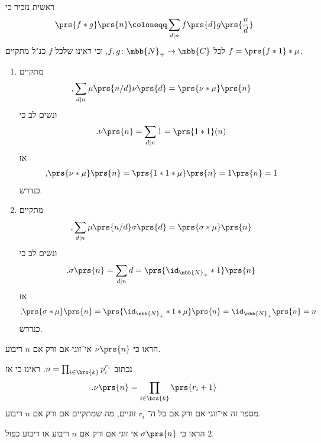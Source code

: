 \documentclass[a4paper,10pt,twoside,openany]{book}
\begin{document}
\begin{solution}
ראשית נזכיר כי
\begin{align*}
\prs{f * g}\prs{n} \coloneqq \sum_{d \mid n} f\prs{d} g\prs{\frac{n}{d}}
\end{align*}
לכל
$f,g \colon \mbb{N}_+ \to \mbb{C}$,
וכי ראינו שלכל
$f$
כנ"ל מתקיים
$f = \prs{f * 1} * \mu$.

\begin{enumerate}[label = (\alph*)]
\item
מתקיים
\[\text{,} \sum_{d \mid n} \mu\prs{n/d} \nu\prs{d} = \prs{\nu * \mu}\prs{n}\]
ונשים לב כי
\[\text{.} \nu\prs{n} = \sum_{d \mid n} 1 = \prs{1 * 1}(n)\]
אז
\begin{align*}
\text{,} \prs{\nu * \mu}\prs{n} = \prs{1 * 1 * \mu}\prs{n} = 1\prs{n} = 1
\end{align*}
כנדרש.

\item
מתקיים
\begin{align*}
\text{,} \sum_{d \mid n} \mu\prs{n/d} \sigma\prs{d} = \prs{\sigma * \mu}\prs{n}
\end{align*}
ונשים לב כי
\[\text{.} \sigma\prs{n} = \sum_{d \mid n} d = \prs{\id_{\mbb{N}_+} * 1}\prs{n}\]
אז
\begin{align*}
\text{,} \prs{\sigma * \mu}\prs{n} = \prs{\id_{\mbb{N}_+} * 1 * \mu}\prs{n} = \id_{\mbb{N}_+}\prs{n} = n 
\end{align*}
כנדרש.
\end{enumerate}
\end{solution}

\begin{exercisechap}
הראו כי
$\nu\prs{n}$
אי־זוגי אם ורק אם
$n$
ריבוע.
\end{exercisechap}

\begin{solution}
נכתוב
$n = \prod_{i \in \brs{k}} p_i^{r_i}$.
ראינו כי אז
\[\text{.}\nu\prs{n} = \prod_{i \in \brs{k}} \prs{r_i + 1}\]
מספר זה אי־זוגי אם ורק אם כל ה־%
$r_i$
זוגיים, מה שמתקיים אם ורק אם
$n$
ריבוע.
\end{solution}

\begin{exercisechap}
הראו כי
$\sigma\prs{n}$
אי זוגי אם ורק אם
$n$
ריבוע או ריבוע כפול
$2$.
\end{exercisechap}

\begin{solution}

\end{solution}
\end{document}
